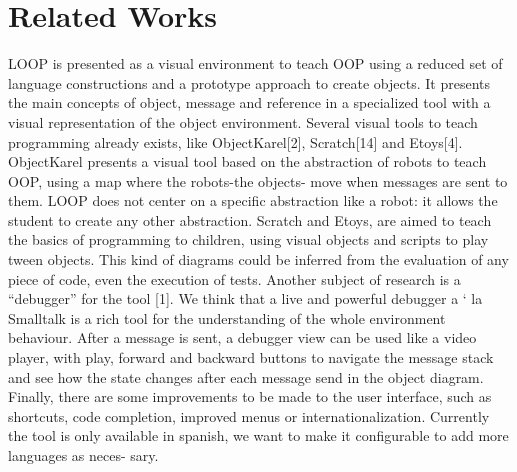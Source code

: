 \section{Related Works}
\label{sec:related}

LOOP is presented as a visual environment to teach OOP using
a reduced set of language constructions and a prototype approach
to create objects. It presents the main concepts of object, message
and reference in a specialized tool with a visual representation of
the object environment. Several visual tools to teach programming
already exists, like ObjectKarel[2], Scratch[14] and Etoys[4].
ObjectKarel presents a visual tool based on the abstraction of
robots to teach OOP, using a map where the robots-the objects-
move when messages are sent to them. LOOP does not center on a
specific abstraction like a robot: it allows the student to create any
other abstraction. Scratch and Etoys, are aimed to teach the basics
of programming to children, using visual objects and scripts to play
tween objects. This kind of diagrams could be inferred from the
evaluation of any piece of code, even the execution of tests.
Another subject of research is a “debugger” for the tool [1]. We
think that a live and powerful debugger a ` la Smalltalk is a rich tool
for the understanding of the whole environment behaviour. After a
message is sent, a debugger view can be used like a video player,
with play, forward and backward buttons to navigate the message
stack and see how the state changes after each message send in the
object diagram.
Finally, there are some improvements to be made to the user
interface, such as shortcuts, code completion, improved menus or
internationalization. Currently the tool is only available in spanish,
we want to make it configurable to add more languages as neces-
sary.


